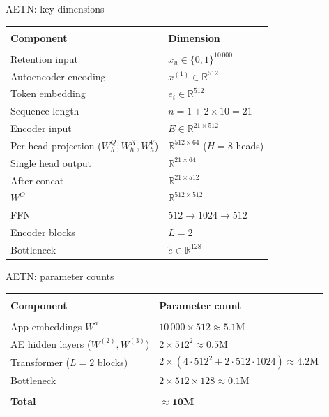 \documentclass[aspectratio=169,t]{beamer}
\begin{document}
\begin{frame}[shrink=1]{AETN: key dimensions}
    \begin{center}
    \begin{tabular}{ll}
      \hline\\[-6pt]
      \textbf{Component} & \textbf{Dimension} \\[3pt]
      \hline\\[-4pt]
      Retention input   & $x_u \in \{0,1\}^{10\,000}$ \\[4pt]
      Autoencoder encoding  & $x^{(1)} \in \mathbb{R}^{512}$ \\[4pt]
      Token embedding   & $e_i \in \mathbb{R}^{512}$ \\[4pt]
      Sequence length   & $n = 1 + 2{\times}10 = 21$ \\[4pt]
      Encoder input     & $E \in \mathbb{R}^{21 \times 512}$ \\[4pt]
      Per-head projection ($W^Q_h, W^K_h, W^V_h$) & $\mathbb{R}^{512 \times 64}$ \;($H{=}8$ heads) \\[4pt]
      Single head output & $\mathbb{R}^{21 \times 64}$ \\[4pt]
      After concat      & $\mathbb{R}^{21 \times 512}$ \\[4pt]
      $W^O$             & $\mathbb{R}^{512 \times 512}$ \\[4pt]
      FFN               & $512 \to 1024 \to 512$ \\[4pt]
      Encoder blocks    & $L = 2$ \\[4pt]
      Bottleneck        & $\tilde{e} \in \mathbb{R}^{128}$ \\[4pt]
    \end{tabular}
    \end{center}
  \end{frame}

\begin{frame}{AETN: parameter counts}
  \begin{center}
  \begin{tabular}{ll}
    \hline\\[-6pt]
    \textbf{Component} & \textbf{Parameter count} \\[3pt]
    \hline\\[-4pt]
  App embeddings $W^a$ & $10\,000 \times 512 \approx 5.1\text{M}$ \\[4pt]
  AE hidden layers ($W^{(2)}, W^{(3)}$) & $2 \times 512^2 \approx 0.5\text{M}$ \\[4pt]
  Transformer ($L{=}2$ blocks) & $2\times(4{\cdot}512^2 + 2{\cdot}512{\cdot}1024) \approx 4.2\text{M}$ \\[4pt]
  Bottleneck & $2 \times 512{\times}128 \approx 0.1\text{M}$ \\[4pt]
  \hline\\[-4pt]
  \textbf{Total} & $\approx \mathbf{10\text{M}}$ \\[4pt]
  \hline
  \end{tabular}
  \end{center}
\end{frame}
  
\end{document}
